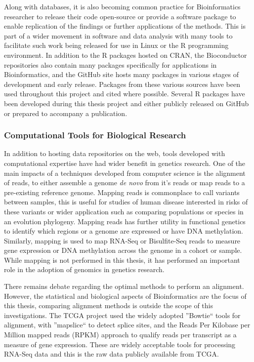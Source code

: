 Along with databases, it is also becoming common practice for Bioinformatics researcher to release their code open-source or provide a software package to enable replication of the findings or further applications of the methods. This is part of a wider movement in software and data analysis with many tools to facilitate such work being released for use in Linux or the R programming environment. In addition to the R packages hosted on CRAN, the Bioconductor repositories also contain many packages specifically for applications in Bioinformatics, and the GitHub site hosts many packages in various stages of development and early release. Packages from these various sources have been used throughout this project and cited where possible. Several R packages have been developed during this thesis project and either publicly released on GitHub or prepared to accompany a publication.

\subsubsection{Computational Tools for Biological Research}
In addition to hosting data repositories on the web, tools developed with computational expertise have had wider benefit in  genetics research. One of the main impacts of a techniques developed from computer science is the alignment of reads, to either assemble a genome \textit{de novo} from it's reads or map reads to a pre-existing reference genome. Mapping reads is commonplace to call variants between samples, this is useful for studies of human disease interested in risks of these variants or wider application such as comparing populations or species in an evolution phylogeny. Mapping reads has further utility in functional genetics to identify which regions or a genome are expressed or have DNA methylation. Similarly, mapping is used to map RNA-Seq or Bisulfite-Seq reads to measure gene expression or DNA methylation across the genome in a cohort or sample. While mapping is not performed in this thesis, it has performed an important role in the adoption of genomics in genetics research.

There remains debate regarding the optimal methods to perform an alignment. However, the statistical and biological aspects of Bioinformatics are the focus of this thesis, comparing alignment methods is outside the scope of this investigations. The TCGA project used the widely adopted ''Bowtie`` tools for alignment, with ''mapslice`` to detect splice sites, and the Reads Per Kilobase per Million mapped reads (RPKM) approach to qualify reads per transcript as a measure of gene expression. These are widely acceptable tools for processing RNA-Seq data and this is the raw data publicly available from TCGA.


